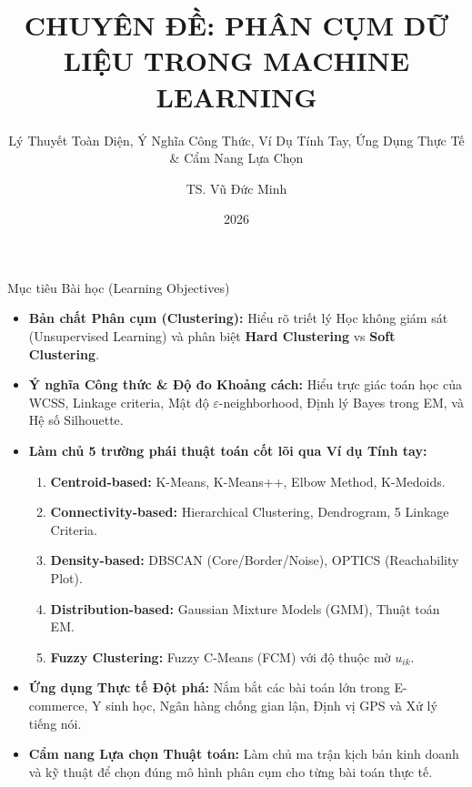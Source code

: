 \documentclass[aspectratio=169,10pt]{beamer}
\title[Phân cụm Dữ liệu (Clustering)]{\Large \textbf{CHUYÊN ĐỀ: PHÂN CỤM DỮ LIỆU TRONG MACHINE LEARNING}}
\subtitle{\normalsize Lý Thuyết Toàn Diện, Ý Nghĩa Công Thức, Ví Dụ Tính Tay, Ứng Dụng Thực Tế \& Cẩm Nang Lựa Chọn}
\author[TS. Vũ Đức Minh]{TS. Vũ Đức Minh}
\institute[NEU]{Khoa Khoa học Dữ liệu và Trí tuệ Nhân tạo\\Trường Công nghệ -- Đại học Kinh tế Quốc dân (NEU)}
\date{2026}
\begin{document}
\begin{frame}
  \titlepage
\end{frame}

\begin{frame}{Mục tiêu Bài học (Learning Objectives)}
  \small
  \begin{itemize}\setlength{\itemsep}{2.5pt}
    \item \textbf{Bản chất Phân cụm (Clustering):} Hiểu rõ triết lý Học không giám sát (Unsupervised Learning) và phân biệt \textbf{Hard Clustering} vs \textbf{Soft Clustering}.
    \item \textbf{Ý nghĩa Công thức \& Độ đo Khoảng cách:} Hiểu trực giác toán học của WCSS, Linkage criteria, Mật độ $\varepsilon$-neighborhood, Định lý Bayes trong EM, và Hệ số Silhouette.
    \item \textbf{Làm chủ 5 trường phái thuật toán cốt lõi qua Ví dụ Tính tay:}
      \begin{enumerate}\setlength{\itemsep}{1.5pt}
        \item \textbf{Centroid-based:} K-Means, K-Means++, Elbow Method, K-Medoids.
        \item \textbf{Connectivity-based:} Hierarchical Clustering, Dendrogram, 5 Linkage Criteria.
        \item \textbf{Density-based:} DBSCAN (Core/Border/Noise), OPTICS (Reachability Plot).
        \item \textbf{Distribution-based:} Gaussian Mixture Models (GMM), Thuật toán EM.
        \item \textbf{Fuzzy Clustering:} Fuzzy C-Means (FCM) với độ thuộc mờ $u_{ik}$.
      \end{enumerate}
    \item \textbf{Ứng dụng Thực tế Đột phá:} Nắm bắt các bài toán lớn trong E-commerce, Y sinh học, Ngân hàng chống gian lận, Định vị GPS và Xử lý tiếng nói.
    \item \textbf{Cẩm nang Lựa chọn Thuật toán:} Làm chủ ma trận kịch bản kinh doanh và kỹ thuật để chọn đúng mô hình phân cụm cho từng bài toán thực tế.
  \end{itemize}
\end{frame}
\end{document}
